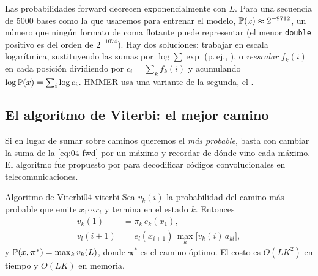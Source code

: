 \begin{cuidado}
Las probabilidades forward decrecen exponencialmente con $L$. Para una secuencia de \num{5000} bases como la que usaremos para entrenar el modelo, $\mathbb{P}(x)\approx2^{-9712}$, un número que ningún formato de coma flotante puede representar (el menor \texttt{double} positivo es del orden de $2^{-1074}$). Hay dos soluciones: trabajar en escala logarítmica, sustituyendo las sumas por $\log\sum\exp$ (p.\,ej., ), o \emph{reescalar} $f_k(i)$ en cada posición dividiendo por $c_i=\sum_kf_k(i)$ y acumulando $\log\mathbb{P}(x)=\sum_i\log c_i$. HMMER usa una variante de la segunda, el  \parencite{c04-eddy2011}.
\end{cuidado}

\subsection{El algoritmo de Viterbi: el mejor camino}

Si en lugar de sumar sobre caminos queremos el \emph{más probable}, basta con cambiar la suma de la \cref{eq:04-fwd} por un máximo y recordar de dónde vino cada máximo. El algoritmo fue propuesto por \textcite{c04-viterbi1967} para decodificar códigos convolucionales en telecomunicaciones.

\begin{teorema}{Algoritmo de Viterbi}{04-viterbi}
Sea $v_k(i)$ la probabilidad del camino más probable que emite $x_1\cdots x_i$ y termina en el estado $k$. Entonces
\begin{align}
v_k(1) &= \pi_k\,e_k(x_1), \label{eq:04-vit-ini}\\
v_l(i+1) &= e_l(x_{i+1})\,\max_{k}\big[v_k(i)\,a_{kl}\big], \label{eq:04-vit}
\end{align}
y $\mathbb{P}(x,\boldsymbol{\pi}^*)=\max_k v_k(L)$, donde $\boldsymbol{\pi}^*$ es el camino óptimo. El costo es $O(LK^2)$ en tiempo y $O(LK)$ en memoria.
\end{teorema}

\begin{simbolos}
\end{simbolos}


